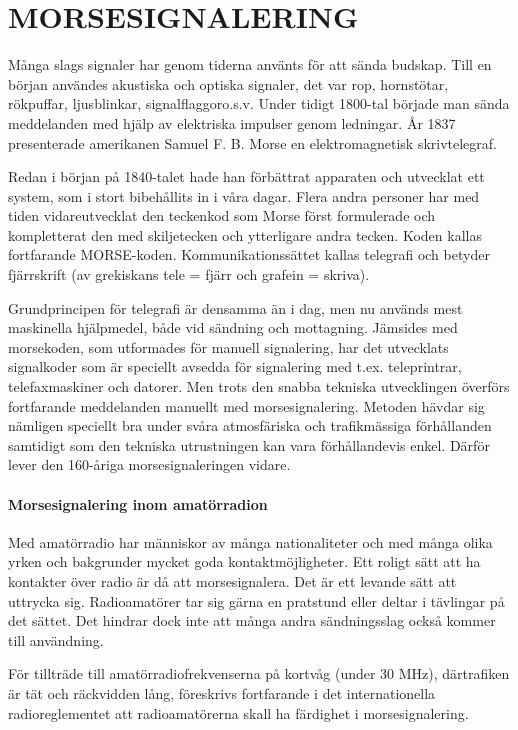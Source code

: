 \part{MORSESIGNALERING}

Många slags signaler har genom tiderna använts för att sända budskap. Till en
början användes akustiska och optiska signaler, det var rop, hornstötar,
rökpuffar, ljusblinkar, signalflaggoro.s.v. Under tidigt 1800-tal började man
sända meddelanden med hjälp av elektriska impulser genom ledningar. År 1837
presenterade amerikanen Samuel F. B. Morse en elektromagnetisk skrivtelegraf.

Redan i början på 1840-talet hade han förbättrat apparaten och utvecklat ett
system, som i stort bibehållits in i våra dagar. Flera andra personer har med
tiden vidareutvecklat den teckenkod som Morse först formulerade och kompletterat
den med skiljetecken och ytterligare andra tecken. Koden kallas fortfarande
MORSE-koden. Kommunikationssättet kallas telegrafi och betyder fjärrskrift (av
grekiskans tele = fjärr och grafein = skriva).

Grundprincipen för telegrafi är densamma än i dag, men nu används mest
maskinella hjälpmedel, både vid sändning och mottagning. Jämsides med
morsekoden, som utformades för manuell signalering, har det utvecklats
signalkoder som är speciellt avsedda för signalering med t.ex. teleprintrar,
telefaxmaskiner och datorer. Men trots den snabba tekniska utvecklingen överförs
fortfarande meddelanden manuellt med morsesignalering. Metoden hävdar sig
nämligen speciellt bra under svåra atmosfäriska och trafikmässiga förhållanden
samtidigt som den tekniska utrustningen kan vara förhållandevis enkel. Därför
lever den 160-åriga morsesignaleringen vidare.

\subsection{Morsesignalering inom amatörradion}

Med amatörradio har människor av många nationaliteter och med många olika yrken
och bakgrunder mycket goda kontaktmöjligheter. Ett roligt sätt att ha kontakter
över radio är då att morsesignalera. Det är ett levande sätt att uttrycka sig.
Radioamatörer tar sig gärna en pratstund eller deltar i tävlingar på det sättet.
Det hindrar dock inte att många andra sändningsslag också kommer till
användning.

För tillträde till amatörradiofrekvenserna på kortvåg (under 30 MHz),
därtrafiken är tät och räckvidden lång, föreskrivs fortfarande i det
internationella radioreglementet att radioamatörerna skall ha färdighet i
morsesignalering.


